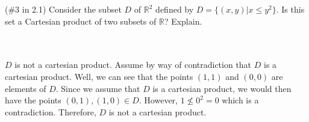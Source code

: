 (\#3 in 2.1) Consider the subset $D$ of $\mathbb{R}^2$ defined by $D=\{(x,y)|x\leq y^2\}$. Is this set a
Cartesian product of two subsets of $\mathbb{R}$? Explain.\\\\

\begin{solution}\renewcommand{\qedsymbol}{}\ \\
    $D$ is not a cartesian product. Assume by way of contradiction that $D$ is a cartesian product.
    Well, we can see that the points $(1,1)$ and $(0,0)$ are elements of $D$. Since we assume that $D$
    is a cartesian product, we would then have the points $(0,1),(1,0)\in D$. However, $1\nleq 0^2=0$
    which is a contradiction. Therefore, $D$ is not a cartesian product.

\end{solution}